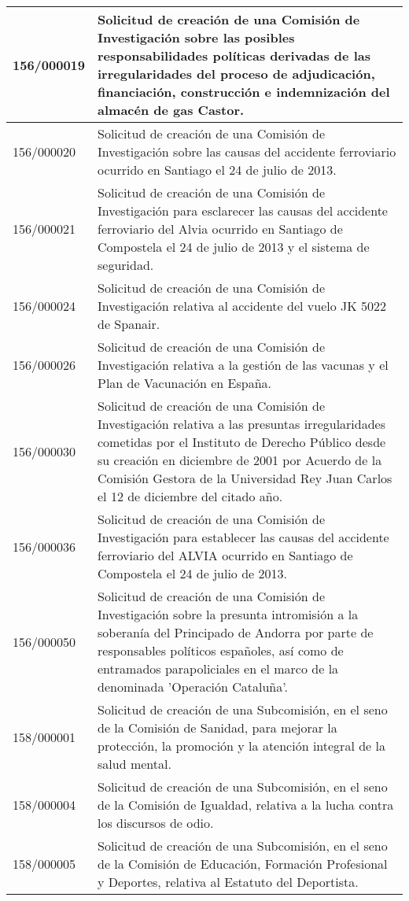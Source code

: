 {\begin{table}[H]
\begin{center}
\begin{tabularx}{\linewidth}{| l | X |}
\hline
156/000019 & Solicitud de creación de una Comisión de Investigación sobre las posibles responsabilidades políticas derivadas de las irregularidades del proceso de adjudicación, financiación, construcción e indemnización del almacén de gas Castor. \\
\hline
156/000020 & Solicitud de creación de una Comisión de Investigación sobre las causas del accidente ferroviario ocurrido en Santiago el 24 de julio de 2013. \\
\hline
156/000021 & Solicitud de creación de una Comisión de Investigación para esclarecer las causas del accidente ferroviario del Alvia ocurrido en Santiago de Compostela el 24 de julio de 2013 y el sistema de seguridad. \\
\hline
156/000024 & Solicitud de creación de una Comisión de Investigación relativa al accidente del vuelo JK 5022 de Spanair. \\
\hline
156/000026 & Solicitud de creación de una Comisión de Investigación relativa a la gestión de las vacunas y el Plan de Vacunación en España. \\
\hline
156/000030 & Solicitud de creación de una Comisión de Investigación relativa a las presuntas irregularidades cometidas por el Instituto de Derecho Público desde su creación en diciembre de 2001 por Acuerdo de la Comisión Gestora de la Universidad Rey Juan Carlos el 12 de diciembre del citado año. \\
\hline
156/000036 & Solicitud de creación de una Comisión de Investigación para establecer las causas del accidente ferroviario del ALVIA ocurrido en Santiago de Compostela el 24 de julio de 2013. \\
\hline
156/000050 & Solicitud de creación de una Comisión de Investigación sobre la presunta intromisión a la soberanía del Principado de Andorra por parte de responsables políticos españoles, así como de entramados parapoliciales en el marco de la denominada 'Operación Cataluña'. \\
\hline
158/000001 & Solicitud de creación de una Subcomisión, en el seno de la Comisión de Sanidad, para mejorar la protección, la promoción y la atención integral de la salud mental. \\
\hline
158/000004 & Solicitud de creación de una Subcomisión, en el seno de la Comisión de Igualdad, relativa a la lucha contra los discursos de odio. \\
\hline
158/000005 & Solicitud de creación de una Subcomisión, en el seno de la Comisión de Educación, Formación Profesional y Deportes, relativa al Estatuto del Deportista. \\

\end{tabularx}
\end{center}
\end{table}}
